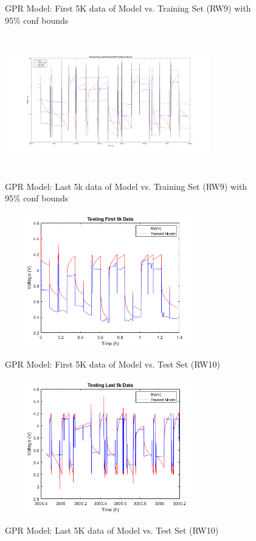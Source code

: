 \begin{figure}
\begin{multicols}{2}
	\caption{GPR Model: First 5K data of Model vs. Training Set (RW9) with 95\% conf bounds}
	\label{fig:first_5k_rw9_v_model_w_bounds}
	\includegraphics[height=2.3in, width=3.5in]{figures/GPR/last_5k_rw9_v_model_w_bounds}
	\caption{GPR Model: Last 5k data of Model vs. Training Set (RW9) with 95\% conf bounds}
	\label{fig:last_5k_rw9_v_model_w_bounds}
\end{multicols}
\begin{multicols}{2}
	\includegraphics[height=2.3in, width=3.5in]{figures/GPR/first_5k_rw10_v_model}
	\caption{GPR Model: First 5K data of Model vs. Test Set (RW10)}
	\label{fig:first_5k_rw10_v_model}
	\includegraphics[height=2.3in, width=3.5in]{figures/GPR/last_5k_rw10_v_model}
	\caption{GPR Model: Last 5K data of Model vs. Test Set (RW10)}
	\label{fig:last_5k_rw10_v_model}
\end{multicols}
\end{figure}
